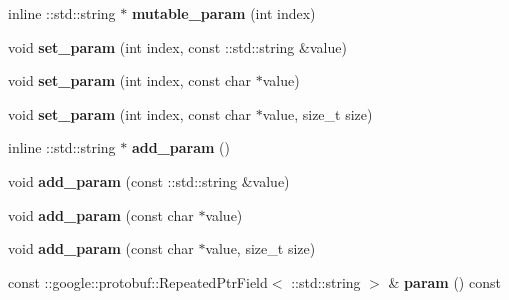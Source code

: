 \begin{DoxyCompactItemize}
\mbox{\label{classcaffe_1_1_v1_layer_parameter_aa75d294635e4aae955cde3cafcfe0d82}} 
inline \+::std\+::string $\ast$ {\bfseries mutable\+\_\+param} (int index)
\item 
\mbox{\label{classcaffe_1_1_v1_layer_parameter_a19be9e0e887aa003c150fadb18ebb5e2}} 
void {\bfseries set\+\_\+param} (int index, const \+::std\+::string \&value)
\item 
\mbox{\label{classcaffe_1_1_v1_layer_parameter_a12c840777f737e222cf2bec6bc74ba7f}} 
void {\bfseries set\+\_\+param} (int index, const char $\ast$value)
\item 
\mbox{\label{classcaffe_1_1_v1_layer_parameter_a7b098fe3f991606860fc59a6f4c19182}} 
void {\bfseries set\+\_\+param} (int index, const char $\ast$value, size\+\_\+t size)
\item 
\mbox{\label{classcaffe_1_1_v1_layer_parameter_a3a0dfeb91a2edcdc36bf960980c5d6e5}} 
inline \+::std\+::string $\ast$ {\bfseries add\+\_\+param} ()
\item 
\mbox{\label{classcaffe_1_1_v1_layer_parameter_a697eea73e8a4277bb355f2af986a7917}} 
void {\bfseries add\+\_\+param} (const \+::std\+::string \&value)
\item 
\mbox{\label{classcaffe_1_1_v1_layer_parameter_a1cabc34827aeceaea561c2b151031d2c}} 
void {\bfseries add\+\_\+param} (const char $\ast$value)
\item 
\mbox{\label{classcaffe_1_1_v1_layer_parameter_af2a08a02ab4ee034791756e411821485}} 
void {\bfseries add\+\_\+param} (const char $\ast$value, size\+\_\+t size)
\item 
\mbox{\label{classcaffe_1_1_v1_layer_parameter_aa423b0ef0c0ac0fa7cce2c8e9c285bce}} 
const \+::google\+::protobuf\+::\+Repeated\+Ptr\+Field$<$ \+::std\+::string $>$ \& {\bfseries param} () const
\item 
\mbox{\label{classcaffe_1_1_v1_layer_parameter_ab24a61fbd94eae2b6e0440d98dc4b5ab}} 

\end{DoxyCompactItemize}
